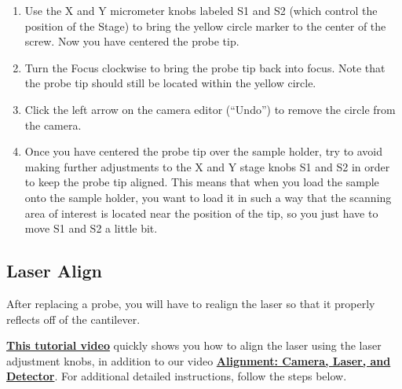 \documentclass{../lab}
\begin{document}
\begin{enumerate}
\begin{itemize}
    \end{itemize}
    
    \item Use the X and Y micrometer knobs labeled S1 and S2 (which control the position of the Stage) to bring the yellow circle marker to the center of the screw.  Now you have centered the probe tip.
    
    \item Turn the Focus clockwise to bring the probe tip back into focus.  Note that the probe tip should still be located within the yellow circle.
    
    \item Click the left arrow on the camera editor (``Undo'') to remove the circle from the camera.
    
    \item Once you have centered the probe tip over the sample holder, try to avoid making further adjustments to the X and Y stage knobs S1 and S2 in order to keep the probe tip aligned.  This means that when you load the sample onto the sample holder, you want to load it in such a way that the scanning area of interest is located near the position of the tip, so you just have to move S1 and S2 a little bit.
\end{enumerate}

\subsection{Laser Align}
\label{subsec:LaserAlign}

After replacing a probe, you will have to realign the laser so that it properly reflects off of the cantilever.

\href{http://experimentationlab.berkeley.edu/sites/default/files/AFMImages/4.0\%20Laser\%20Align\%28V1.0\%29.wmv}{\textbf{This tutorial video}} quickly shows you how to align the laser using the laser adjustment knobs, in addition to our video  \href{http://experimentationlab.berkeley.edu/sites/default/files/alignment\_final2.mp4}{\textbf{Alignment: Camera, Laser, and Detector}}.  For additional detailed instructions, follow the steps below.
\end{document}
